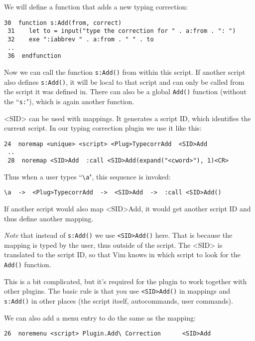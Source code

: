 We will define a function that adds a new typing correction:

\begin{Verbatim}[samepage=true]
 30  function s:Add(from, correct)
 31    let to = input("type the correction for " . a:from . ": ")
 32    exe ":iabbrev " . a:from . " " . to
 ..
 36  endfunction
\end{Verbatim}

Now we can call the function \texttt{s:Add()} from within this script.
If another script also defines \texttt{s:Add()}, it will be local to that script and can only be called from the script it was defined in.
There can also be a global \texttt{Add()}  function (without the ``\texttt{s:}"), which is again another function.

<SID> can be used with mappings.
It generates a script ID, which identifies the current script.
In our typing correction plugin we use it like this:

\begin{Verbatim}[samepage=true]
 24  noremap <unique> <script> <Plug>TypecorrAdd  <SID>Add
 ..
 28  noremap <SID>Add  :call <SID>Add(expand("<cword>"), 1)<CR>
\end{Verbatim}

Thus when a user types ``\texttt{\textbackslash{}a}", this sequence is invoked:

\begin{Verbatim}[samepage=true]
 \a  ->  <Plug>TypecorrAdd  ->  <SID>Add  ->  :call <SID>Add()
\end{Verbatim}

If another script would also map <SID>Add, it would get another script ID and thus define another mapping.

\emph{Note} that instead of \texttt{s:Add()} we use \texttt{<SID>Add()} here.
That is because the mapping is typed by the user, thus outside of the script.
The <SID> is translated to the script ID, so that Vim knows in which script to look for the \texttt{Add()} function.

This is a bit complicated, but it's required for the plugin to work together with other plugins.
The basic rule is that you use \texttt{<SID>Add()} in mappings and \texttt{s:Add()} in other places (the script itself, autocommands, user commands).

We can also add a menu entry to do the same as the mapping:

\begin{Verbatim}[samepage=true]
 26  noremenu <script> Plugin.Add\ Correction      <SID>Add
\end{Verbatim}

